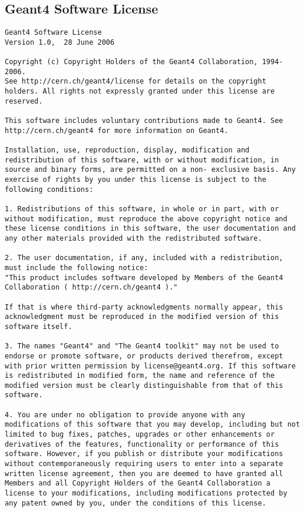 \documentclass[12pt]{article}
\begin{document}
\subsection{Geant4 Software License}
\begin{lstlisting}
Geant4 Software License
Version 1.0,  28 June 2006
 
Copyright (c) Copyright Holders of the Geant4 Collaboration, 1994-2006.
See http://cern.ch/geant4/license for details on the copyright holders. All rights not expressly granted under this license are reserved.

This software includes voluntary contributions made to Geant4. See http://cern.ch/geant4 for more information on Geant4.

Installation, use, reproduction, display, modification and redistribution of this software, with or without modification, in source and binary forms, are permitted on a non- exclusive basis. Any exercise of rights by you under this license is subject to the following conditions:

1. Redistributions of this software, in whole or in part, with or without modification, must reproduce the above copyright notice and these license conditions in this software, the user documentation and any other materials provided with the redistributed software.

2. The user documentation, if any, included with a redistribution, must include the following notice:
"This product includes software developed by Members of the Geant4 Collaboration ( http://cern.ch/geant4 )."

If that is where third-party acknowledgments normally appear, this acknowledgment must be reproduced in the modified version of this software itself.

3. The names "Geant4" and "The Geant4 toolkit" may not be used to endorse or promote software, or products derived therefrom, except with prior written permission by license@geant4.org. If this software is redistributed in modified form, the name and reference of the modified version must be clearly distinguishable from that of this software.

4. You are under no obligation to provide anyone with any modifications of this software that you may develop, including but not limited to bug fixes, patches, upgrades or other enhancements or derivatives of the features, functionality or performance of this software. However, if you publish or distribute your modifications without contemporaneously requiring users to enter into a separate written license agreement, then you are deemed to have granted all Members and all Copyright Holders of the Geant4 Collaboration a license to your modifications, including modifications protected by any patent owned by you, under the conditions of this license.


\end{lstlisting}
\end{document}
